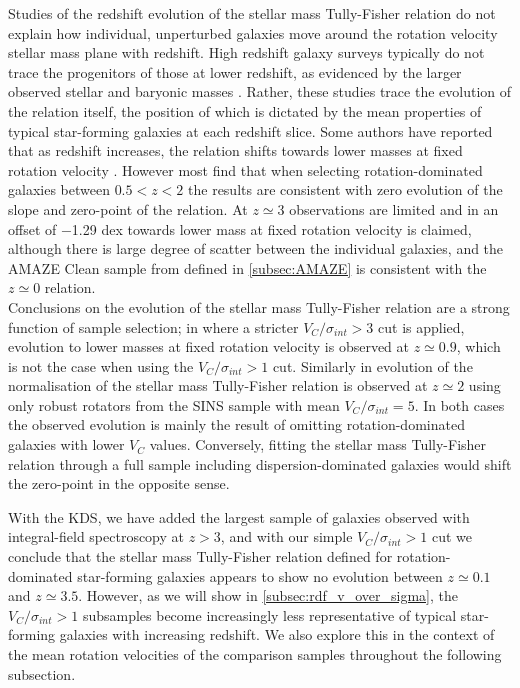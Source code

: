 \documentclass[fleqn,usenatbib]{mnras}
\begin{document}
\noindent
Studies of the redshift evolution of the stellar mass Tully-Fisher relation do not explain how individual, unperturbed galaxies move around the rotation velocity stellar mass plane with redshift. 
High redshift galaxy surveys typically do not trace the progenitors of those at lower redshift, as evidenced by the larger observed stellar and baryonic masses \citep[e.g.][]{Cresci2009,Reyes2011,Wisnioski2015,Ubler2017}.
Rather, these studies trace the evolution of the relation itself, the position of which is dictated by the mean properties of typical star-forming galaxies at each redshift slice.
Some authors have reported that as redshift increases, the relation shifts towards lower masses at fixed rotation velocity \citep[e.g.][]{Puech2008,Cresci2009,Puech2010,Straatman2017,Ubler2017}.
However most find that when selecting rotation-dominated galaxies between $0.5 < z < 2$ \citep[e.g.][]{Flores2006,Miller2011,Kassin2012,Miller2012,Vergani2012,Miller2014,Contini2015a,DiTeodoro2016,Simons2016,Pelliccia2017,Molina2017,Harrison2017} the results are consistent with zero evolution of the slope and zero-point of the relation.
At $z\simeq3$ observations are limited and in \cite{Gnerucci2011} an offset of $-$1.29 dex towards lower mass at fixed rotation velocity is claimed, although there is large degree of scatter between the individual galaxies, and the AMAZE Clean sample from \cite{Gnerucci2011} defined in \cref{subsec:AMAZE} is consistent with the $z\simeq0$ relation. \\

\noindent
Conclusions on the evolution of the stellar mass Tully-Fisher relation are a strong function of sample selection; in \cite{Tiley2016} where a stricter $V_{C}/\sigma_{int} > 3$ cut is applied, evolution to lower masses at fixed rotation velocity is observed at $z\simeq0.9$, which is not the case when using the $V_{C}/\sigma_{int} > 1$ cut.
Similarly in \cite{Cresci2009} evolution of the normalisation of the stellar mass Tully-Fisher relation is observed at $z\simeq2$ using only robust rotators from the SINS sample with mean $V_{C}/\sigma_{int} = 5$.
In both cases the observed evolution is mainly the result of omitting rotation-dominated galaxies with lower $V_{C}$ values.
Conversely, fitting the stellar mass Tully-Fisher relation through a full sample including dispersion-dominated galaxies would shift the zero-point in the opposite sense.

With the KDS, we have added the largest sample of galaxies observed with integral-field spectroscopy at $z>3$, and with our simple $V_{C}/\sigma_{int} > 1$ cut we conclude that the stellar mass Tully-Fisher relation defined for rotation-dominated star-forming galaxies appears to show no evolution between $z\simeq0.1$ and $z\simeq3.5$.
However, as we will show in \cref{subsec:rdf_v_over_sigma}, the $V_{C}/\sigma_{int} > 1$ subsamples become increasingly less representative of typical star-forming galaxies with increasing redshift.
We also explore this in the context of the mean rotation velocities of the comparison samples throughout the following subsection. 
\end{document}
